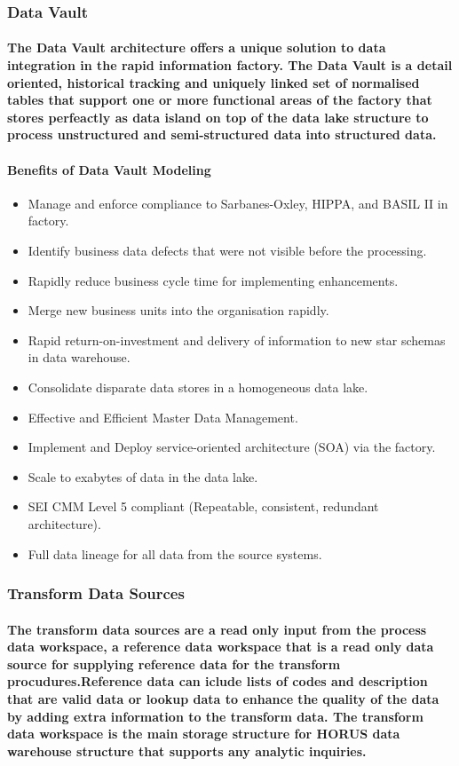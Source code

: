 \documentclass{acm_proc_article-sp}
\begin{document}
\subsubsection{Data Vault}
\paragraph{The Data Vault architecture offers a unique solution to data integration in the rapid information factory. The Data Vault is a detail oriented, historical tracking and uniquely linked set of normalised tables that support one or more functional areas of the factory that stores perfeactly as data island on top of the data lake structure to process unstructured and semi-structured data into structured data.}
\paragraph{Benefits of Data Vault Modeling}
\begin{itemize}
\item Manage and enforce compliance to Sarbanes-Oxley, HIPPA, and BASIL II in factory.
\item Identify business data defects that were not visible before the processing.
\item Rapidly reduce business cycle time for implementing enhancements.
\item Merge new business units into the organisation rapidly.
\item Rapid return-on-investment and delivery of information to new star schemas in data warehouse.
\item Consolidate disparate data stores in a homogeneous data lake.
\item Effective and Efficient Master Data Management.
\item Implement and Deploy service-oriented architecture (SOA) via the factory.
\item Scale to exabytes of data in the data lake.
\item SEI CMM Level 5 compliant (Repeatable, consistent, redundant architecture).
\item Full data lineage for all data from the source systems.
\end{itemize}
\subsubsection{Transform Data Sources}
\paragraph{The transform data sources are a read only input from the process data workspace, a reference data workspace that is a read only data source for supplying reference data for the transform procudures.Reference data can iclude lists of codes and description that are valid data or lookup data to enhance the quality of the data by adding extra information to the transform data. The transform data workspace is the main storage structure for HORUS data warehouse structure that supports any analytic inquiries.}
\end{document}
